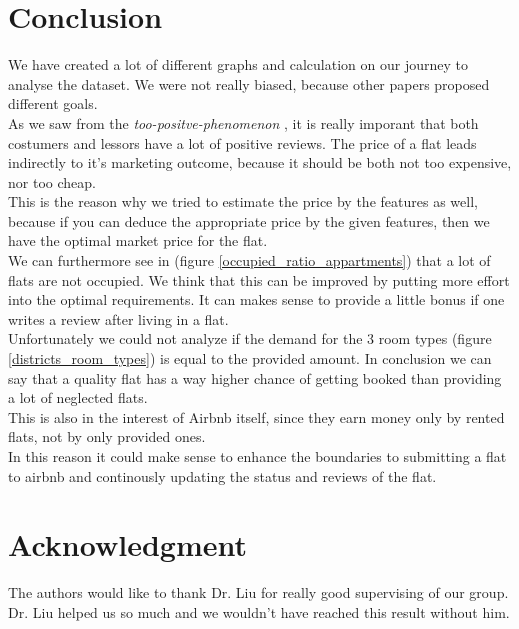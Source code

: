 \documentclass[journal]{IEEEtran}
\begin{document}
\section{Conclusion}
We have created a lot of different graphs and calculation on our journey to analyse the dataset. We were not really biased, because other papers proposed different goals. \\ 
As we saw from the \textit{too-positve-phenomenon} \cite{RN3}, it is really imporant that both costumers and lessors have a lot of positive reviews. The price of a flat leads indirectly to it's marketing outcome, because it should be both not too expensive, nor too cheap. \\
This is the reason why we tried to estimate the price by the features as well, because if you can deduce the appropriate price by the given features, then we have the optimal market price for the flat. \\
We can furthermore see in (figure \ref{occupied_ratio_appartments}) that a lot of flats are not occupied. We think that this can be improved by putting more effort into the optimal requirements. It can makes sense to provide a little bonus if one writes a review after living in a flat. \\
Unfortunately we could not analyze if the demand for the 3 room types (figure \ref{districts_room_types}) is equal to the provided amount. 
In conclusion we can say that a quality flat has a way higher chance of getting booked than providing a lot of neglected flats. \\
This is also in the interest of Airbnb itself, since they earn money only by rented flats, not by only provided ones. \\
In this reason it could make sense to enhance the boundaries to submitting a flat to airbnb and continously updating the status and reviews of the flat.

\section*{Acknowledgment}
\noindent The authors would like to thank Dr. Liu for really good supervising of our group. Dr. Liu helped us so much and we wouldn't have reached this result without him. 



\end{document}
